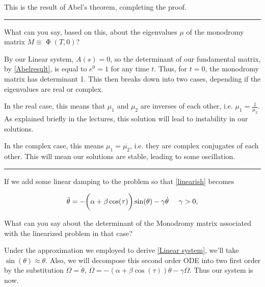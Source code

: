 \documentclass[12pt]{article}
\newcommand{\jump}{\vspace{5mm}}
\begin{document}
\begin{enumerate}[]
\begin{solution}
        This is the result of Abel's theorem, completing the proof. 
        \end{solution}

        \newpage
        \hrule
        \jump
        What can you say, based on this, about the eigenvalues $\mu$ of the monodromy matrix $M \equiv \upPhi(T,0)$?

        \jump
        \begin{solution}
        
            By our Linear system, $A(s) = 0$, so the determinant of our fundamental matrix, by \ref{Abelresult}, is equal to $e^0 = 1$ for any time $t$. Thus, for $t = 0$, the monodromy matrix has determinant 1. This then breaks down into two cases, depending if the eigenvalues are real or complex.

            In the real case, this means that $\mu_1$ and $\mu_2$ are inverses of each other, i.e. $\mu_1 = \frac{1}{\mu_2}$. As explained briefly in the lectures, this solution will lead to instability in our solutions. 

            In the complex case, this means $\mu_1 = \overline{\mu_2}$, i.e. they are complex conjugates of each other. This will mean our solutions are stable, leading to some oscillation.
        \end{solution}

        \jump
        \hrule
        \jump
        If we add some linear damping to the problem so that \ref{linearish} becomes

        \begin{align}
            \ddot{\theta} = -\bigg(    \alpha + \beta\cos(\tau)\bigg)\sin(\theta) - \gamma\dot{\theta}     \hspace{5mm} \gamma > 0,
        \end{align}

        What can you say about the determinant of the Monodromy matrix associated with the linearized problem in that case?

        \jump
        \begin{solution}

            Under the approximation we employed to derive \ref{Linear system}, we'll take $\sin(\theta) \approx \theta$. Also, we will decompose this second order ODE into two first order by the substitution $\Omega = \dot{\theta}$, $\dot{\Omega} = -(\alpha + \beta\cos(\tau))\theta - \gamma \Omega$. Thus our system is now.


\end{solution}
\end{enumerate}
\end{document}
